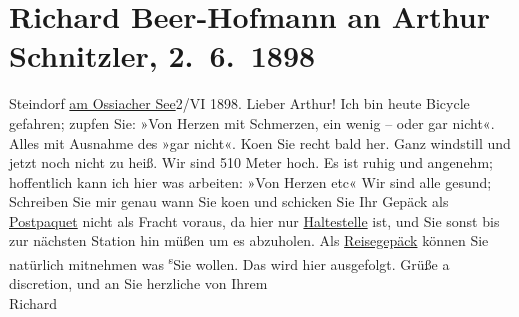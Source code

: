

         \renewcommand{\erwaehnteOrte}{Orte: Steindorf am Ossiacher See, Wien}
         \renewcommand{\erwaehnteWerke}{}
               \section[Richard Beer-Hofmann an Arthur Schnitzler, 2. 6. 1898]{ Richard Beer-Hofmann an Arthur Schnitzler, 2. 6. 1898}\nopagebreak{}\rehead{ }\begin{ledgroupsized}[t]{13cm}\normalsize\beginnumbering \toendnotes[C]{\smallbreak\pagebreak[2]} 
\pstart
           \raggedleft{}{\pb}Steindorf \uline{am Ossiacher
                        See}2/VI 1898.\pend
           \pstart
           Lieber Arthur! Ich bin heute Bicycle gefahren; zupfen Sie: »Von
               Herzen mit Schmerzen, ein wenig – oder gar nicht«. Alles mit Ausnahme des »gar
               nicht«. Ko{\geminationm}en Sie recht bald her. Ganz windstill und
               jetzt noch nicht zu heiß. Wir sind 510 Meter hoch. Es ist ruhig und ange{\pb}nehm; hoffentlich kann ich hier was
               arbeiten: »Von Herzen etc«\pend
           \pstart
           Wir sind alle gesund; Schreiben Sie mir genau wann Sie ko{\geminationm}en und schicken Sie Ihr Gepäck als \uline{Postpaquet} nicht
               als Fracht voraus, da hier nur \uline{Haltestelle} ist, und
               Sie sonst bis zur nächsten Station {\pb} hin müßen um es abzuholen. Als \uline{Reisegepäck} können Sie natürlich mitnehmen was \substVorne{}\textsuperscript{s}\substDazwischen{}S\substHinten{}ie wollen. Das wird hier ausgefolgt. Grüße a discretion, und an Sie herzliche
               von\pend
           \pstart
           Ihrem{\\}Richard\pend
           
         
         \endnumbering{}\end{ledgroupsized}  \newcommand{\dateiname}{L00799}\newcommand{\titel}{Richard Beer-Hofmann an Arthur Schnitzler, 2. 6. 1898}\newcommand{\editorInnen}{Martin Anton Müller und Gerd-Hermann Susen}
      